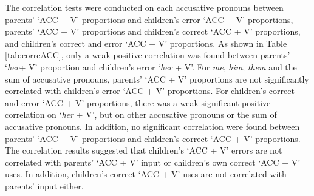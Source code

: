 The correlation tests were conducted on each accusative pronouns between parents' `ACC + V' proportions and children's error `ACC + V' proportions, parents' `ACC + V' proportions and children's correct `ACC + V' proportions, and children's correct and error  `ACC + V' proportions. As shown in Table \ref{tab:correACC}, only a weak positive correlation was found between parents' `\textit{her}+ V' proportion and children's error `\textit{her} + V'. For \textit{me}, \textit{him}, \textit{them} and the sum of accusative pronouns, parents' `ACC + V' proportions are not significantly correlated with children's error `ACC + V' proportions. For children's correct and error `ACC + V' proportions, there was a weak significant positive correlation on `\textit{her} + V', but on other accusative pronouns or the sum of accusative pronouns. In addition, no significant correlation were found between parents' `ACC + V' proportions and children's correct `ACC + V' proportions. The correlation results suggested that children's `ACC + V' errors are not correlated with parents' `ACC + V' input or children's own correct `ACC + V' uses. In addition, children's correct `ACC + V' uses are not correlated with parents' input either. 

